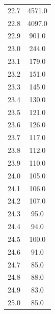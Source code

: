 \begin{table}
\begin{tabular}[t]{cc}
  22.7 & 4571.0\\
  22.8 & 4097.0\\
  22.9 & 901.0\\
  23.0 & 244.0\\
  23.1 & 179.0\\
  23.2 & 151.0\\
  23.3 & 145.0\\
  23.4 & 130.0\\
  23.5 & 121.0\\
  23.6 & 126.0\\
  23.7 & 117.0\\
  23.8 & 112.0\\
  23.9 & 110.0\\
  24.0 & 105.0\\
  24.1 & 106.0\\
  24.2 & 107.0\\
  24.3 & 95.0\\
  24.4 & 94.0\\
  24.5 & 100.0\\
  24.6 & 91.0\\
  24.7 & 85.0\\
  24.8 & 88.0\\
  24.9 & 83.0\\
  25.0 & 85.0\\
  \bottomrule
  \end{tabular}
  \label{tab:emmision2}
\end{table}
\FloatBarrier

